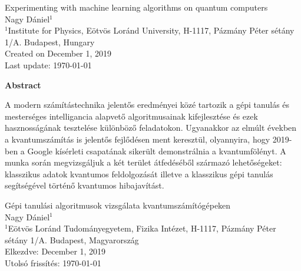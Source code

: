 \documentclass[12pt, a4paper]{article}
\begin{document}
\begin{center}
\vspace*{5.0cm}
\LARGE{Experimenting with machine learning algorithms on quantum computers}\\
\vspace{2.0cm}
\large{Nagy Dániel$^1$}\\
\vspace{2.0cm}
\large{
    $^1$Institute for Physics, Eötvös Loránd University, H-1117, Pázmány Péter sétány 1/A. Budapest, Hungary\\%
    \vspace{5.0cm}
    Created on December 1, 2019\\
    \vspace{1.0cm}
    Last update: \today
}
\end{center}
\thispagestyle{empty} %
\newpage

\begin{center}
    \textbf{Abstract}\\
    \par A modern számítástechnika jelentős eredményei közé tartozik a gépi
    tanulás és mesterséges intelligancia alapvető algoritmusainak kifejlesztése és ezek 
    hasznosságának tesztelése különböző feladatokon. Ugyanakkor az elmúlt években a 
    kvantumszámítás is jelentős fejlődésen ment keresztül, olyannyira, hogy 2019-ben a Google kísérleti
    csapatának sikerült demonstrálnia a kvantumfölényt. A munka során megvizsgáljuk a két terület átfedéséből 
    származó lehetőségeket: klasszikus adatok kvantumos feldolgozását illetve a klasszikus
    gépi tanulás segítségével történő kvantumos hibajavítást.
\end{center}
\thispagestyle{empty} %
\newpage

\begin{center}
\vspace*{5.0cm}
\LARGE{Gépi tanulási algoritmusok vizsgálata kvantumszámítógépeken}\\
\vspace{2.0cm}
\large{Nagy Dániel$^1$}\\
\vspace{2.0cm}
\large{
    $^1$Eötvös Loránd Tudományegyetem, Fizika Intézet, H-1117, Pázmány Péter sétány 1/A. Budapest, Magyarország\\%
    \vspace{5.0cm}
    Elkezdve: December 1, 2019\\
    \vspace{1.0cm}
    Utolsó frissítés: \today
}
\end{center}
\thispagestyle{empty} %
\newpage
\end{document}
